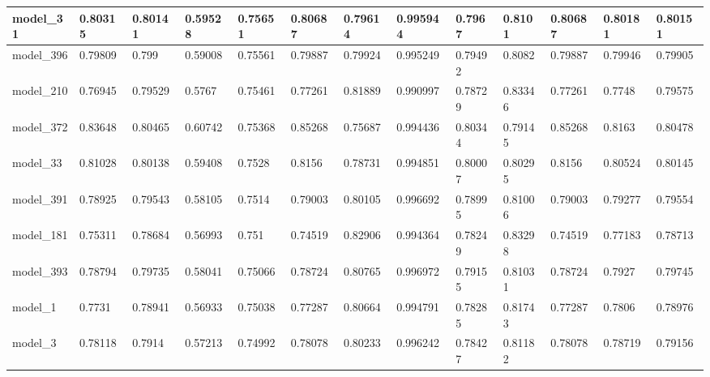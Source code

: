 \begin{tabular}{|l|l|l|l|l|l|l|l|l|l|l|l|l|}
model\_31      & 0.80315     & 0.80141        & 0.59528      & 0.75651          & 0.80687              & 0.79614              & 0.995944     & 0.7967            & 0.8101             & 0.80687         & 0.80181     & 0.80151      \\ \hline
model\_396     & 0.79809     & 0.799          & 0.59008      & 0.75561          & 0.79887              & 0.79924              & 0.995249     & 0.79492           & 0.8082             & 0.79887         & 0.79946     & 0.79905      \\ \hline
model\_210     & 0.76945     & 0.79529        & 0.5767       & 0.75461          & 0.77261              & 0.81889              & 0.990997     & 0.78729           & 0.83346            & 0.77261         & 0.7748      & 0.79575      \\ \hline
model\_372     & 0.83648     & 0.80465        & 0.60742      & 0.75368          & 0.85268              & 0.75687              & 0.994436     & 0.80344           & 0.79145            & 0.85268         & 0.8163      & 0.80478      \\ \hline
model\_33      & 0.81028     & 0.80138        & 0.59408      & 0.7528           & 0.8156               & 0.78731              & 0.994851     & 0.80007           & 0.80295            & 0.8156          & 0.80524     & 0.80145      \\ \hline
model\_391     & 0.78925     & 0.79543        & 0.58105      & 0.7514           & 0.79003              & 0.80105              & 0.996692     & 0.78995           & 0.81006            & 0.79003         & 0.79277     & 0.79554      \\ \hline
model\_181     & 0.75311     & 0.78684        & 0.56993      & 0.751            & 0.74519              & 0.82906              & 0.994364     & 0.78249           & 0.83298            & 0.74519         & 0.77183     & 0.78713      \\ \hline
model\_393     & 0.78794     & 0.79735        & 0.58041      & 0.75066          & 0.78724              & 0.80765              & 0.996972     & 0.79155           & 0.81031            & 0.78724         & 0.7927      & 0.79745      \\ \hline
model\_1       & 0.7731      & 0.78941        & 0.56933      & 0.75038          & 0.77287              & 0.80664              & 0.994791     & 0.78285           & 0.81743            & 0.77287         & 0.7806      & 0.78976      \\ \hline
model\_3       & 0.78118     & 0.7914         & 0.57213      & 0.74992          & 0.78078              & 0.80233              & 0.996242     & 0.78427           & 0.81182            & 0.78078         & 0.78719     & 0.79156      \\ \hline

\end{tabular}
